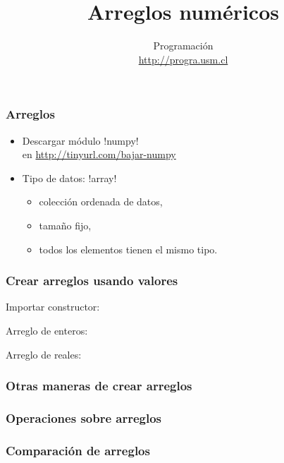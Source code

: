 \documentclass[12pt]{beamer}
\title{Arreglos numéricos}
\author{
  Programación \\ \url{http://progra.usm.cl}
}
\date{}
\begin{document}
  \begin{frame}
    \maketitle
  \end{frame}

  \begin{frame}
    \label{intro-arreglos}
    \frametitle{Arreglos}
    \begin{itemize}
      \item Descargar módulo \li!numpy! \\
        en \url{http://tinyurl.com/bajar-numpy}
        \vfill
      \item Tipo de datos: \li!array!
        \begin{itemize}
          \item colección ordenada de datos,
          \item tamaño fijo,
          \item todos los elementos
            tienen el mismo tipo.
        \end{itemize}
    \end{itemize}
  \end{frame}

  \begin{frame}
    \label{crear-arreglo-valores}
    \frametitle{Crear arreglos usando valores}
    Importar constructor:
    
    \vfill
    Arreglo de enteros:
    
    \vfill
    Arreglo de reales:
    
  \end{frame}

  \begin{frame}
    \label{crear-arreglo-funciones}
    \frametitle{Otras maneras de crear arreglos}
    
  \end{frame}

  \begin{frame}
    \label{operaciones-arreglos}
    \frametitle{Operaciones sobre arreglos}
    
  \end{frame}

  \begin{frame}
    \label{comparacion-arreglos}
    \frametitle{Comparación de arreglos}
    
  \end{frame}
\end{document}
